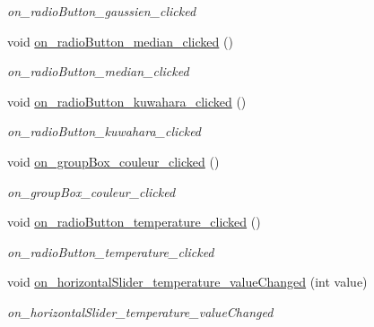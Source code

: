 \begin{DoxyCompactItemize}
\begin{DoxyCompactList}\small\item\em on\+\_\+radio\+Button\+\_\+gaussien\+\_\+clicked \end{DoxyCompactList}\item 
\mbox{\label{classMainWindow_a0232e17dff3e5531a8ec8b5f93766a87}} 
void \hyperlink{classMainWindow_a0232e17dff3e5531a8ec8b5f93766a87}{on\+\_\+radio\+Button\+\_\+median\+\_\+clicked} ()
\begin{DoxyCompactList}\small\item\em on\+\_\+radio\+Button\+\_\+median\+\_\+clicked \end{DoxyCompactList}\item 
\mbox{\label{classMainWindow_a613137e99b4e04a8aa4143f1daa2286a}} 
void \hyperlink{classMainWindow_a613137e99b4e04a8aa4143f1daa2286a}{on\+\_\+radio\+Button\+\_\+kuwahara\+\_\+clicked} ()
\begin{DoxyCompactList}\small\item\em on\+\_\+radio\+Button\+\_\+kuwahara\+\_\+clicked \end{DoxyCompactList}\item 
\mbox{\label{classMainWindow_a4d9bf83c8cffaac0b6feda0e00dd76f0}} 
void \hyperlink{classMainWindow_a4d9bf83c8cffaac0b6feda0e00dd76f0}{on\+\_\+group\+Box\+\_\+couleur\+\_\+clicked} ()
\begin{DoxyCompactList}\small\item\em on\+\_\+group\+Box\+\_\+couleur\+\_\+clicked \end{DoxyCompactList}\item 
\mbox{\label{classMainWindow_ae176e250dbd50fcabf40064101a90987}} 
void \hyperlink{classMainWindow_ae176e250dbd50fcabf40064101a90987}{on\+\_\+radio\+Button\+\_\+temperature\+\_\+clicked} ()
\begin{DoxyCompactList}\small\item\em on\+\_\+radio\+Button\+\_\+temperature\+\_\+clicked \end{DoxyCompactList}\item 
void \hyperlink{classMainWindow_a73f04012a1def56b994904685190fa88}{on\+\_\+horizontal\+Slider\+\_\+temperature\+\_\+value\+Changed} (int value)
\begin{DoxyCompactList}\small\item\em on\+\_\+horizontal\+Slider\+\_\+temperature\+\_\+value\+Changed \end{DoxyCompactList}\item 

\end{DoxyCompactItemize}
